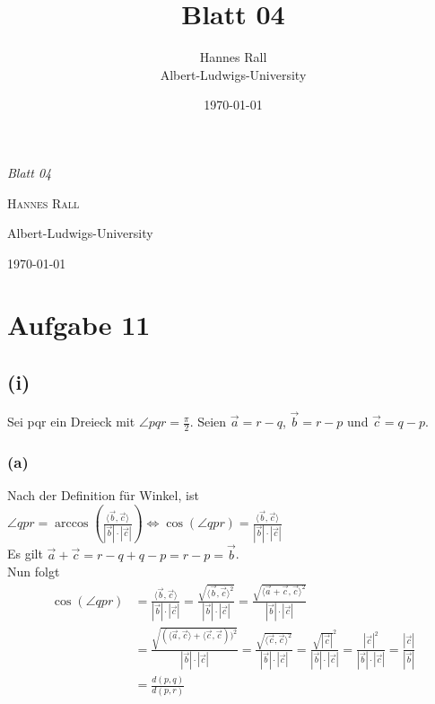 \documentclass[12pt,a4paper]{article}
\title{Blatt 04}
\author{Hannes Rall \\ Albert-Ludwigs-University}
\date{\today}
\begin{document}
 
\begin{titlepage}     
    \centering     
    \vspace*{2cm}     
    {\Huge\itshape Blatt 04\par}     
    \vspace{2cm}     
    {\Large\textsc{Hannes Rall}\par}     
    \vfill     
    {\large Albert-Ludwigs-University\\}     
    \vspace{1cm}     
    {\large\today\par}
\end{titlepage}

\newpage
\section*{Aufgabe 11}
\subsection*{(i)}
Sei pqr ein Dreieck mit $\angle pqr = \frac{\pi}{2}$. Seien $\vec{a} = r - q$, $\vec{b} = r - p$ und $\vec{c} = q-p$.
\subsubsection*{(a)}
Nach der Definition für Winkel, ist $\angle qpr = \arccos \left(\frac{\langle \vec{b}, \vec{c} \rangle}{|\vec{b}| \cdot |\vec{c}|}\right) \Leftrightarrow \cos(\angle qpr) = \frac{\langle \vec{b}, \vec{c} \rangle}{|\vec{b}| \cdot |\vec{c}|}$\\
Es gilt $\vec{a} + \vec{c} = r - q + q - p = r - p = \vec{b}$.\\
Nun folgt \\
\begin{align*}
    \cos(\angle qpr) 
    &= \frac{\langle \vec{b}, \vec{c} \rangle}{|\vec{b}| \cdot |\vec{c}|} = \frac{\sqrt{\langle \vec{b}, \vec{c} \rangle^{2}}}{|\vec{b}| \cdot |\vec{c}|} = \frac{\sqrt{\langle \vec{a} + \vec{c}, \vec{c} \rangle^{2}}}{|\vec{b}| \cdot |\vec{c}|} \\
    &= \frac{\sqrt{(\langle \vec{a}, \vec{c} \rangle + \langle \vec{c}, \vec{c}))^{2}}}{|\vec{b}| \cdot |\vec{c}|} = \frac{\sqrt{\langle \vec{c}, \vec{c} \rangle^{2}}}{|\vec{b}| \cdot |\vec{c}|} =\frac{\sqrt{|\vec{c}|}^{2}}{|\vec{b}| \cdot |\vec{c}|} = \frac{|\vec{c}|^{2}}{|\vec{b}| \cdot |\vec{c}| } = \frac{|\vec{c}|}{|\vec{b}|} \\
    &= \frac{d(p, q)}{d(p, r)}
\end{align*}
\end{document}
